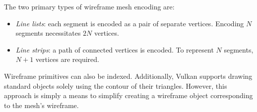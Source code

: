 The two primary types of wireframe mesh encoding are:
\begin{itemize}
    \item \textit{Line lists}: each segment is encoded as a pair of separate vertices. 
        Encoding $N$ segments necessitates $2N$ vertices.
    \item \textit{Line strips}: a path of connected vertices is encoded. 
        To represent $N$ segments, $N+1$ vertices are required.
\end{itemize}
Wireframe primitives can also be indexed. 
Additionally, Vulkan supports drawing standard objects solely using the contour of their triangles. 
However, this approach is simply a means to simplify creating a wireframe object corresponding to the mesh's wireframe.